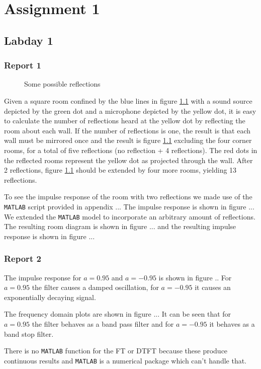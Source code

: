 \documentclass[11pt,titlepage]{report}
\begin{document}
\chapter{Assignment 1}
\section{Labday 1}
\subsection{Report 1}
\begin{figure}[H]
	\centering
	
	\caption{Some possible reflections}
	\label{fig:reflections}
\end{figure}
Given a square room confined by the blue lines in figure \ref{fig:reflections} with a sound source depicted by the green dot and a microphone depicted by the yellow dot, it is easy to calculate the number of reflections heard at the yellow dot by reflecting the room about each wall. If the number of reflections is one, the result is that each wall must be mirrored once and the result is figure \ref{fig:reflections} excluding the four corner rooms, for a total of five reflections (no reflection + 4 reflections). The red dots in the reflected rooms represent the yellow dot as projected through the wall. After 2 reflections, figure \ref{fig:reflections} should be extended by four more rooms, yielding 13 reflections.

To see the impulse response of the room with two reflections we made use of the \texttt{MATLAB} script provided in appendix ... The impulse response is shown in figure ...
We extended the \texttt{MATLAB} model to incorporate an arbitrary amount of reflections. The resulting room diagram is shown in figure ... and the resulting impulse response is shown in figure ...
\subsection{Report 2}
The impulse response for $a=0.95$ and $a=-0.95$ is shown in figure .. For $a=0.95$ the filter causes a damped oscillation, for $a=-0.95$ it causes an exponentially decaying signal.

The frequency domain plots are shown in figure ... It can be seen that for $a=0.95$ the filter behaves as a band pass filter and for $a=-0.95$ it behaves as a band stop filter.

There is no \texttt{MATLAB} function for the FT or DTFT because these produce continuous results and \texttt{MATLAB} is a numerical package which can't handle that.
\end{document}
